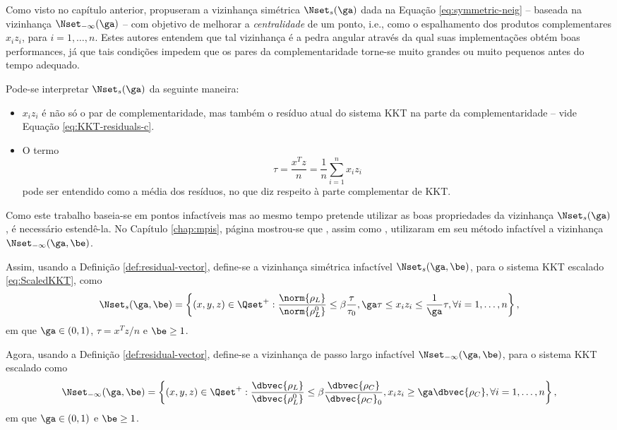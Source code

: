 Como visto no capítulo anterior, \textcite{Colombo:2008ia}  propuseram  a
vizinhança simétrica $\Nset_s(\ga)$ dada na Equação \eqref{eq:symmetric-neig} --
baseada na vizinhança $\Nset_{-\infty}(\ga)$ --  com objetivo de melhorar a
\emph{centralidade} de um ponto, i.e., como o espalhamento dos produtos
complementares $x_iz_i$, para $i=1,\ldots,n$. Estes autores entendem que tal
vizinhança é a pedra angular através da qual suas implementações obtém boas
performances, já que tais condições impedem que os pares da complementaridade
torne-se muito grandes ou muito pequenos antes do tempo adequado.

Pode-se interpretar $\Nset_s(\ga)$ da seguinte maneira:
\begin{itemize}
  \item $x_iz_i$  é não só o par de complementaridade, mas também o resíduo
  atual do sistema KKT na parte da complementaridade -- vide  Equação
  \eqref{eq:KKT-residuals-c}.
  \item O termo  \[\tau = \frac{x^Tz}{n} = \frac{1}{n}\sum_{i=1}^nx_iz_i\]
  pode ser entendido como a média dos resíduos, no que diz respeito à parte
  complementar de KKT.
\end{itemize}

Como este trabalho  baseia-se em pontos infactíveis mas ao mesmo tempo
pretende utilizar as boas propriedades da vizinhança  $\Nset_s(\ga)$,
é necessário estendê-la. No Capítulo \ref{chap:mpis}, página \pageref{eq:infeasible-infty-neig}
mostrou-se que \textcite{Kojima:1993fe}, assim como 
\textcite[pg.~110]{Wright:Primal-dual-interior-point:1997h}, utilizaram em seu
método infactível a vizinhança $\Nset_{-\infty}(\ga,\be)$.


Assim, usando a Definição \ref{def:residual-vector}, define-se  a vizinhança
simétrica infactível $\Nset_s(\ga,\be)$, para o sistema KKT escalado
\eqref{eq:ScaledKKT}, como 
\begin{equation}
\label{eq:infeasible-symmetric-neig}
 \Nset_{s}(\ga,\be) =
 \left\{(x,y,z) \in \Qset^+:\frac{\norm{\rho_L}}{\norm{\rho^0_L}} \leq
\beta\frac{\tau}{\tau_0}, \ga\tau\leq x_iz_i \leq
\frac{1}{\ga}\tau,\forall i =1,\ldots,n  \right\},
\end{equation}
em que $\ga\in(0,1)$, $\tau=x^Tz/n$ e $\be\geq1$.

Agora, usando a Definição \ref{def:residual-vector}, define-se  a vizinhança
de passo largo infactível $\Nset_{-\infty}(\ga,\be)$, para o sistema KKT escalado
como
\begin{equation}
\Nset_{-\infty}(\ga,\be) =
 \left\{(x,y,z) \in \Qset^+:\frac{\dbvec{\rho_L}}{\dbvec{\rho^0_L}} \leq
\beta\frac{\dbvec{\rho_C}}{\dbvec{\rho_C}_0}, x_iz_i \geq
{\ga}\dbvec{\rho_C},\forall i =1,\ldots,n  \right\},
\end{equation}
em que $\ga\in(0,1)$ e $\be\geq1$. 




